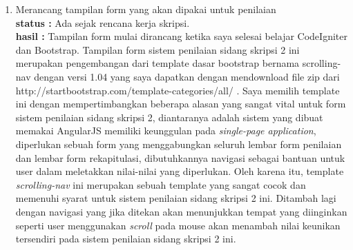 \documentclass[a4paper,twoside]{article}
\begin{document}
\begin{enumerate}
		\item Merancang tampilan form yang akan dipakai untuk penilaian\\
		{\bf status :} Ada sejak rencana kerja skripsi.\\
		{\bf hasil :} Tampilan form mulai dirancang ketika saya selesai belajar CodeIgniter dan Bootstrap. Tampilan form sistem penilaian sidang skripsi 2 ini merupakan pengembangan dari template dasar bootstrap bernama scrolling-nav dengan versi 1.04 yang saya dapatkan dengan mendownload file zip dari http://startbootstrap.com/template-categories/all/ . Saya memilih template ini dengan mempertimbangkan beberapa alasan yang sangat vital untuk form sistem penilaian sidang skripsi 2, diantaranya adalah sistem yang dibuat memakai AngularJS memiliki keunggulan pada \textit{single-page application}, diperlukan sebuah form yang menggabungkan seluruh lembar form penilaian dan lembar form rekapitulasi, dibutuhkannya navigasi sebagai bantuan untuk user dalam meletakkan nilai-nilai yang diperlukan. Oleh karena itu, template \textit{scrolling-nav} ini merupakan sebuah template yang sangat cocok dan memenuhi syarat untuk sistem penilaian sidang skripsi 2 ini. Ditambah lagi dengan navigasi yang jika ditekan akan menunjukkan tempat yang diinginkan seperti user menggunakan \textit{scroll} pada mouse akan menambah nilai keunikan tersendiri pada sistem penilaian sidang skripsi 2 ini.


\end{enumerate}
\end{document}
